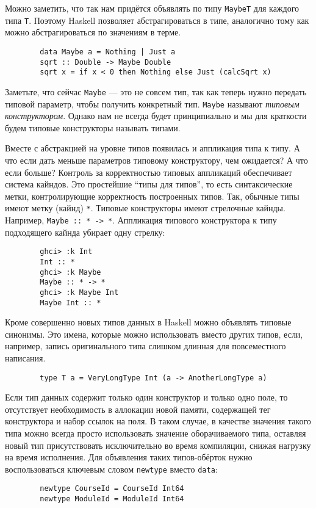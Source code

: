 \documentclass[12pt]{article}
\newcommand{\point}[1]{{\color{blue}\textit{#1}}} %
\begin{document}
    Можно заметить, что так нам придётся объявлять по типу \texttt{MaybeT} для каждого типа \texttt{T}.
    Поэтому Haskell позволяет абстрагироваться в типе, аналогично тому как можно абстрагироваться по значениям в терме.
    \begin{verbatim}
        data Maybe a = Nothing | Just a
        sqrt :: Double -> Maybe Double
        sqrt x = if x < 0 then Nothing else Just (calcSqrt x)
    \end{verbatim}

    Заметьте, что сейчас \texttt{Maybe} --- это не совсем тип, так как теперь нужно передать типовой параметр, чтобы получить конкретный тип.
    \texttt{Maybe} называют \point{типовым конструктором}.
    Однако нам не всегда будет принципиально и мы для краткости будем типовые конструкторы называть типами.

    Вместе с абстракцией на уровне типов появилась и аппликация типа к типу.
    А что если дать меньше параметров типовому конструктору, чем ожидается?
    А что если больше?
    Контроль за корректностью типовых аппликаций обеспечивает система кайндов.
    Это простейшие ``типы для типов'', то есть синтаксические метки, контролирующие корректность построенных типов.
    Так, обычные типы имеют метку (кайнд) \texttt{*}.
    Типовые конструкторы имеют стрелочные кайнды.
    Например, \texttt{Maybe :: * -> *}.
    Аппликация типового конструктора к типу подходящего кайнда убирает одну стрелку:
    \begin{verbatim}
        ghci> :k Int
        Int :: *
        ghci> :k Maybe
        Maybe :: * -> *
        ghci> :k Maybe Int
        Maybe Int :: *
    \end{verbatim}

    Кроме совершенно новых типов данных в Haskell можно объявлять типовые синонимы.
    Это имена, которые можно использовать вместо других типов, если, например, запись оригинального типа слишком длинная для повсеместного написания.
    \begin{verbatim}
        type T a = VeryLongType Int (a -> AnotherLongType a)
    \end{verbatim}

    Если тип данных содержит только один конструктор и только одно поле, то отсутствует необходимость в аллокации новой памяти, содержащей тег конструктора и набор ссылок на поля.
    В таком случае, в качестве значения такого типа можно всегда просто использовать значение оборачиваемого типа, оставляя новый тип присутствовать исключительно во время компиляции, снижая нагрузку на время исполнения.
    Для объявления таких типов-обёрток нужно воспользоваться ключевым словом \texttt{newtype} вместо \texttt{data}:
    \begin{verbatim}
        newtype CourseId = CourseId Int64
        newtype ModuleId = ModuleId Int64
    \end{verbatim}
\end{document}
